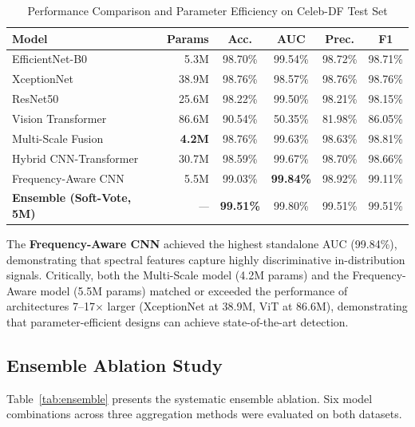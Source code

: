 \documentclass[runningheads]{llncs}
\begin{document}
\begin{table}[H]
\caption{Performance Comparison and Parameter Efficiency on Celeb-DF Test Set}
\label{tab:celebd_results}
\centering
\small
\setlength{\tabcolsep}{5pt}
\begin{tabular}{lrcccc}
\toprule
\textbf{Model} & \textbf{Params} & \textbf{Acc.} & \textbf{AUC} & \textbf{Prec.} & \textbf{F1} \\
\midrule
EfficientNet-B0   & 5.3M  & 98.70\% & 99.54\% & 98.72\% & 98.71\% \\
XceptionNet       & 38.9M & 98.76\% & 98.57\% & 98.76\% & 98.76\% \\
ResNet50          & 25.6M & 98.22\% & 99.50\% & 98.21\% & 98.15\% \\
Vision Transformer & 86.6M & 90.54\% & 50.35\% & 81.98\% & 86.05\% \\
\midrule
Multi-Scale Fusion      & \textbf{4.2M} & 98.76\% & 99.63\% & 98.63\% & 98.81\% \\
Hybrid CNN-Transformer  & 30.7M & 98.59\% & 99.67\% & 98.70\% & 98.66\% \\
Frequency-Aware CNN     & 5.5M  & 99.03\% & \textbf{99.84\%} & 98.92\% & 99.11\% \\
\midrule
\textbf{Ensemble (Soft-Vote, 5M)} & \textit{---} & \textbf{99.51\%} & 99.80\% & 99.51\% & 99.51\% \\
\bottomrule
\end{tabular}
\end{table}

The \textbf{Frequency-Aware CNN} achieved the highest standalone AUC (99.84\%), demonstrating that spectral features capture highly discriminative in-distribution signals. Critically, both the Multi-Scale model (4.2M params) and the Frequency-Aware model (5.5M params) matched or exceeded the performance of architectures 7--17$\times$ larger (XceptionNet at 38.9M, ViT at 86.6M), demonstrating that parameter-efficient designs can achieve state-of-the-art detection.

\subsection{Ensemble Ablation Study}
Table~\ref{tab:ensemble} presents the systematic ensemble ablation. Six model combinations across three aggregation methods were evaluated on both datasets.
\end{document}
